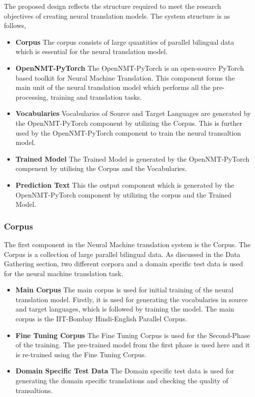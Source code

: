 The proposed design reflects the structure required to meet the research objectives of creating neural translation models. The system structure is as follows,

\begin{itemize}
    \item \textbf{Corpus} The corpus consists of large quantities of parallel bilingual data which is essential for the neural translation model.
    \item \textbf{OpenNMT-PyTorch} The OpenNMT-PyTorch is an open-source PyTorch based toolkit for Neural Machine Translation. This component forms the main unit of the neural translation model which performs all the pre-processing, training and translation tasks.
    \item \textbf{Vocabularies} Vocabularies of Source and Target Languages are generated by the OpenNMT-PyTorch component by utilizing the Corpus. This is further used by the OpenNMT-PyTorch component to train the neural transaltion model.
    \item \textbf{Trained Model} The Trained Model is generated by the OpenNMT-PyTorch compenent by utilising the Corpus and the Vocabularies.
    \item \textbf{Prediction Text} This the output component which is generated by the OpenNMT-PyTorch component by utilizing the corpus and the Trained Model.
\end{itemize}

\subsubsection{Corpus } The first component in the Neural Machine translation system is the Corpus. The Corpus is a  collection of large parallel bilingual data. As discussed in the Data Gathering section, two different corpora and a domain specific test data is used for the neural machine translation task. 
\begin{itemize}
    \item \textbf{Main Corpus} The main corpus is used for initial training of the neural translation model. Firstly, it is used for generating the vocabularies in source and target languages, which is followed by training the model. The main corpus is the IIT-Bombay Hindi-English Parallel Corpus. 
    \item \textbf{Fine Tuning Corpus} The Fine Tuning Corpus is used for the Second-Phase of the training. The pre-trained model from the first phase is used here and it is re-trained using the Fine Tuning Corpus.
    \item \textbf{Domain Specific Test Data} The Domain specific test data is used for generating the domain specific translations and checking the quality of transaltions.
\end{itemize}

